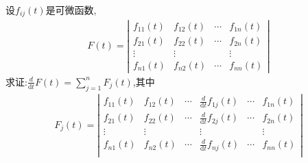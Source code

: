 \documentclass[../../main.tex]{subfiles}
\begin{document}
\begin{proposition}[行列式的求导运算]\label{proposition:行列式的求导运算}
设\(f_{ij}(t)\)是可微函数,
\begin{align*}
F(t) = 
\left| \begin{matrix}
f_{11}(t) & f_{12}(t) & \cdots & f_{1n}(t) \\
f_{21}(t) & f_{22}(t) & \cdots & f_{2n}(t) \\
\vdots & \vdots &  & \vdots \\
f_{n1}(t) & f_{n2}(t) & \cdots & f_{nn}(t)
\end{matrix} \right| 
\nonumber
\end{align*}
求证:$\frac{d}{\mathrm{d}t}F\left( t \right) =\sum_{j=1}^n{F_j\left( t \right)}$,其中
\begin{align*}
F_{j}(t) = 
\left| \begin{matrix}
f_{11}(t)&		f_{12}(t)&		\cdots&		\frac{d}{\mathrm{d}t}f_{1j}(t)&		\cdots&		f_{1n}(t)\\
f_{21}(t)&		f_{22}(t)&		\cdots&		\frac{d}{\mathrm{d}t}f_{2j}(t)&		\cdots&		f_{2n}(t)\\
\vdots&		\vdots&		&		\vdots&		&		\vdots\\
f_{n1}(t)&		f_{n2}(t)&		\cdots&		\frac{d}{\mathrm{d}t}f_{nj}(t)&		\cdots&		f_{nn}(t)\\
\end{matrix} \right| 
\nonumber
\end{align*}
\end{proposition}
\end{document}
